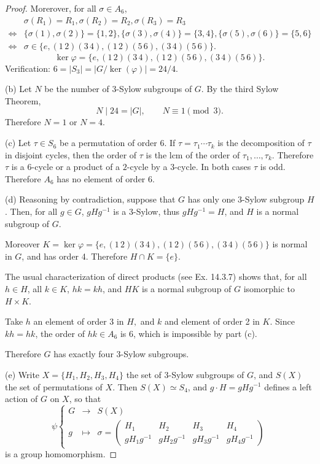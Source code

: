 \documentclass[11pt,a4paper]{article}
\begin{document}
\begin{proof}
Morerover, for all $\sigma \in A_6$,
\begin{align*}
&\sigma(R_1) = R_1, \sigma(R_2) = R_2, \sigma(R_3) = R_3\\
\iff& \{\sigma(1), \sigma(2)\} = \{1,2\}, \{\sigma(3),\sigma(4)\} = \{3,4\}, \{\sigma(5),\sigma(6)\} = \{5,6\}\\
\iff &\sigma \in \{e,(1\,2)(3\,4), (1\,2)(5\,6), (3\,4)(5\,6)\}.
\end{align*}
$$\ker \varphi = \{e,(1\,2)(3\,4), (1\,2)(5\,6), (3\,4)(5\,6)\}.$$
Verification: $6 = |S_3| = |G/\ker(\varphi)| = 24/4$.

\item[(b)] Let $N$ be the number of $3$-Sylow subgroups of $G$. By the third Sylow Theorem,
$$N \mid 24 = |G|, \qquad N \equiv 1 \pmod 3.$$
Therefore $N = 1$ or $N = 4$.

\item[(c)] Let $\tau \in S_6$ be a permutation of order 6. If $\tau = \tau_1\cdots \tau_k$ is the decomposition of $\tau$ in disjoint cycles, then the order of $\tau$ is the lcm of the order of $ \tau_1,\ldots,\tau_k$. Therefore $\tau$ is a $6$-cycle or a product of a $2$-cycle by a $3$-cycle. In both cases $\tau$ is odd. Therefore $A_6$ has no element of order $6$.


\item[(d)] Reasoning by contradiction, suppose that $G$ has only one $3$-Sylow subgroup $H$. Then, for all $g \in G$, $gH g^{-1}$ is a $3$-Sylow, thus $gH g^{-1} = H$, and $H$ is a normal subgroup of $G$. 

Moreover $K = \ker \varphi = \{e,(1\,2)(3\,4), (1\,2)(5\,6), (3\,4)(5\,6)\}$ is normal in $G$, and has order 4. Therefore $H \cap K = \{e\}$.

The usual characterization of direct products (see Ex. 14.3.7) shows that, for all $h \in H$, all $k \in K$, $hk = kh$, and $HK$ is a normal subgroup of $G$ isomorphic to $H \times K$. 

Take $h$ an element of order $3$ in $H,$ and $k$ and element of order 2 in $K$. Since $kh = hk$, the order of $hk \in A_6$ is 6, which is impossible by part (c).

Therefore $G$ has exactly four $3$-Sylow subgroups.

\item[(e)] Write $X = \{H_1,H_2,H_3,H_4\}$ the set of $3$-Sylow subgroups of $G$, and $S(X)$ the set of permutations of $X$. Then $S(X) \simeq S_4$, and $g\cdot H = g H g^{-1}$ defines a left action of $G$ on $X$, so that
$$
\psi 
\left\{
\begin{array}{ccc}
G & \to & S(X)\\
g & \mapsto & 
\sigma = \left(
    \begin{array}{cccc}
      H_1&H_2&H_3&H_4\\
      gH_1g^{-1} & gH_2 g^{-1} & gH_3g^{-1} & gH_4g^{-1}
    \end{array}
\right)
\end{array}
\right.
$$
is a group homomorphism.


\end{proof}
\end{document}
